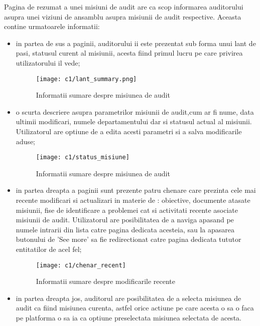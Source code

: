 Pagina de rezumat a unei misiuni de audit are ca scop informarea auditorului asupra unei viziuni de ansamblu asupra misiunii de audit respective. Aceasta contine urmatoarele informatii:\\
\begin{itemize}
	
	\item in partea de sus a paginii, auditorului ii este prezentat sub forma unui lant de pasi, statusul curent al misiunii, acesta fiind primul lucru pe care privirea utilizatorului il vede;
		
		\begin{figure}[h]
		\centering
		
		\texttt{[image: c1/lant\_summary.png]}
		\caption{Informatii sumare despre misiunea de audit}
	\end{figure}
	\item o scurta descriere asupra parametrilor misiunii de audit,cum ar fi nume, data ultimii modificari, numele departamentului dar si statusul actual al misiunii. Utilizatorul are optiune de a edita acesti parametri si a salva modificarile aduse;
	
		\vspace{0.5 cm}
	\begin{figure}[h]
		\centering
		
		\texttt{[image: c1/status\_misiune]}
		\caption{Informatii sumare despre misiunea de audit}
	\end{figure}
	
	\item in partea dreapta a paginii sunt prezente patru chenare care prezinta cele mai recente modificari si actualizari in materie de : obiective, documente atasate misiunii, fise de identificare a problemei cat si activitati recente asociate misiunii de audit. Utilizatorul are posibilitatea de a naviga apasand pe numele intrarii din lista catre pagina dedicata acesteia, sau la apasarea butonului de 'See more' sa fie redirectionat catre pagina dedicata tututor entitatilor de acel fel;
	\begin{figure}[h]
		\centering
		
		\texttt{[image: c1/chenar\_recent]}
		\caption{Informatii sumare despre modificarile recente}
	\end{figure}
	\item in partea dreapta jos, auditorul are posibilitatea de a selecta misiunea de audit ca fiind misiunea curenta, astfel orice actiune pe care acesta o sa o faca pe platforma o sa ia ca optiune preselectata misiunea selectata de acesta.\\
		
	
\end{itemize}


